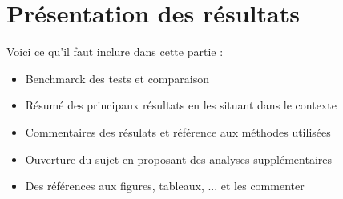\section{Présentation des résultats}

Voici ce qu'il faut inclure dans cette partie :
\begin{itemize}
    \item Benchmarck des tests et comparaison
    \item Résumé des principaux résultats en les situant dans le contexte
    \item Commentaires des résulats et référence aux méthodes utilisées
    \item Ouverture du sujet en proposant des analyses supplémentaires
    \item Des références aux figures, tableaux, ... et les commenter
\end{itemize}
